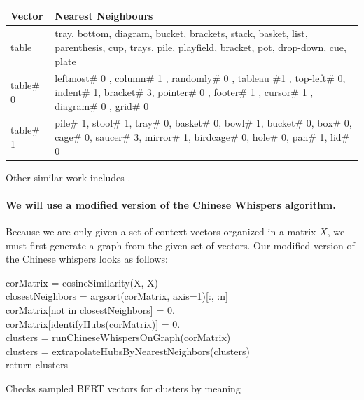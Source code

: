 \documentclass[a4paper,12pt,twoside,openright]{report}
\begin{document}
\begin{table}[htbp]
    \centering
    \begin{tabularx}{\textwidth}{p{50pt}|b}
    \toprule
      {\textbf{Vector}} & {\textbf{Nearest Neighbours}}  \\ \midrule
        table & tray, bottom, diagram, bucket, brackets, stack, basket, list, parenthesis, cup, trays, pile, playfield, bracket, pot, drop-down, cue, plate \\ \hline
        table\# 0 & leftmost\# 0 , column\# 1 , randomly\# 0 , tableau \#1 , top-left\# 0, indent\# 1, bracket\# 3, pointer\# 0 , footer\# 1 , cursor\# 1 , diagram\# 0 , grid\# 0      \\ \hline
        table\# 1 & pile\# 1, stool\# 1, tray\# 0, basket\# 0, bowl\# 1, bucket\# 0, box\# 0, cage\# 0, saucer\# 3, mirror\# 1, birdcage\# 0, hole\# 0, pan\# 1, lid\# 0    \\ \hline
    \end{tabularx}
\end{table}

Other similar work includes \cite{arefyev19}.

\paragraph{We will use a modified version of the Chinese Whispers algorithm.}
Because we are only given a set of context vectors organized in a matrix $X$, we must first generate a graph from the given set of vectors.
Our modified version of the Chinese whispers looks as follows:

\begin{algorithm}[H]
\SetAlgoLined
{}

corMatrix = cosineSimilarity(X, X) \\
closestNeighbors = argsort(corMatrix, axis=1)[:, :n] \\
corMatrix[not in closestNeighbors] = 0. \\

corMatrix[identifyHubs(corMatrix)] = 0. \\

clusters = runChineseWhispersOnGraph(corMatrix) \\

clusters = extrapolateHubsByNearestNeighbors(clusters) \\

return clusters

 \caption{Checks sampled BERT vectors for clusters by  meaning}
\end{algorithm}
\end{document}

